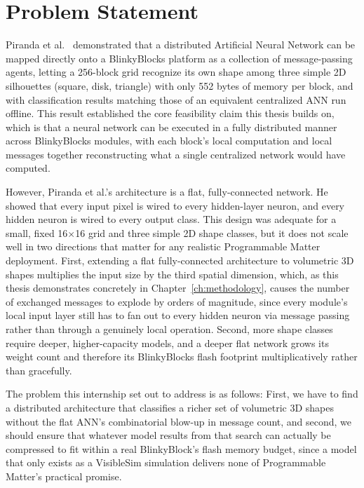 \documentclass[12pt,a4paper]{report}
\begin{document}
\section{Problem Statement}

Piranda et al.~\cite{piranda2024ai4pm} demonstrated that a distributed Artificial Neural Network can be mapped directly onto a BlinkyBlocks platform as a collection of message-passing agents, letting a 256-block grid recognize its own shape among three simple 2D silhouettes (square, disk, triangle) with only 552 bytes of memory per block, and with classification results matching those of an equivalent centralized ANN run offline. This result established the core feasibility claim this thesis builds on, which is that a neural network can be executed in a fully distributed manner across BlinkyBlocks modules, with each block's local computation and local messages together reconstructing what a single centralized network would have computed.

However, Piranda et al.'s architecture is a flat, fully-connected network. He showed that every input pixel is wired to every hidden-layer neuron, and every hidden neuron is wired to every output class. This design was adequate for a small, fixed 16$\times$16 grid and three simple 2D shape classes, but it does not scale well in two directions that matter for any realistic Programmable Matter deployment. First, extending a flat fully-connected architecture to volumetric 3D shapes multiplies the input size by the third spatial dimension, which, as this thesis demonstrates concretely in Chapter~\ref{ch:methodology}, causes the number of exchanged messages to explode by orders of magnitude, since every module's local input layer still has to fan out to every hidden neuron via message passing rather than through a genuinely local operation. Second, more shape classes require deeper, higher-capacity models, and a deeper flat network grows its weight count and therefore its BlinkyBlocks flash footprint multiplicatively rather than gracefully.

The problem this internship set out to address is as follows: First, we have to find a distributed architecture that classifies a richer set of volumetric 3D shapes without the flat ANN's combinatorial blow-up in message count, and second, we should ensure that whatever model results from that search can actually be compressed to fit within a real BlinkyBlock's flash memory budget, since a model that only exists as a VisibleSim simulation delivers none of Programmable Matter's practical promise.
\end{document}
